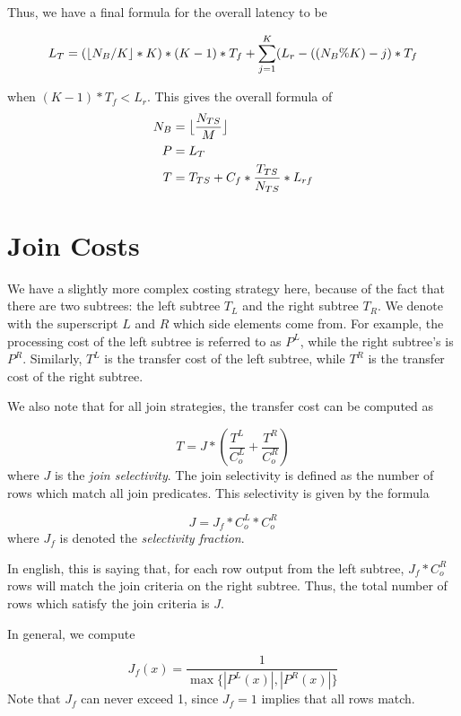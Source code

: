 \documentclass[10pt]{amsart}
\DeclarePairedDelimiter{\floor}{\lfloor}{\rfloor}
\begin{document}
Thus, we have a final formula for the overall latency to be

\begin{equation*}
				L_T = (\floor{N_B/K}*K)*(K-1)*T_f + \sum_{j=1}^{K} (L_r - ((N_B \% K)-j)*T_f
\end{equation*}

when $(K-1)*T_f < L_r$. This gives the overall formula of
\begin{equation}
				\begin{aligned}
								N_B &= \floor[\big]{\frac{N_{TS}}{M}} \\
								P &= L_T \\
								T &= T_{TS} + C_f*\frac{T_{TS}}{N_{TS}}*L_{rf}
				\end{aligned}
\end{equation}


\section{Join Costs}
We have a slightly more complex costing strategy here, because of the fact that there are two subtrees: the left subtree $T_L$ and the right subtree $T_R$. We denote with the superscript $L$ and $R$ which side elements come from. For example, the processing cost of the left subtree is referred to as $P^L$, while the right subtree's is $P^R$. Similarly, $T^L$ is the transfer cost of the left subtree, while $T^R$ is the transfer cost of the right subtree.

We also note that for all join strategies, the transfer cost can be computed as 

\begin{equation}
	T = J*(\frac{T^L}{C_o^L}+\frac{T^R}{C_o^R})
\end{equation}
where $J$ is the \emph{join selectivity}. The join selectivity is defined as the number of rows which match all join predicates. This selectivity is given by the formula

\begin{equation*}
	J = J_f*C_o^L*C_o^R
\end{equation*}
where $J_f$ is denoted the \emph{selectivity fraction}.

In english, this is saying that, for each row output from the left subtree, $J_f*C_o^R$ rows will match the join criteria on the right subtree. Thus, the total number of rows which satisfy the join criteria is $J$.

In general, we compute

\begin{equation}
				J_f(x) = \frac{1}{\max{\lbrace|P^L(x)|,|P^R(x)|\rbrace}}
\end{equation}
Note that $J_f$ can never exceed 1, since $J_f = 1$ implies that all rows match.
\end{document}
